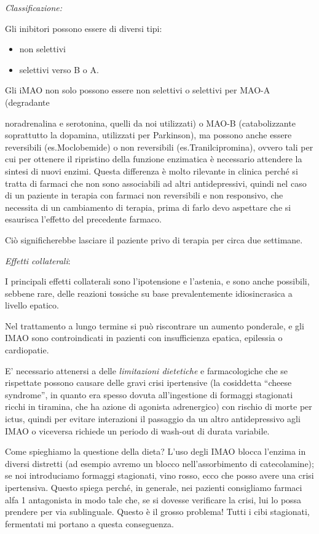 \begin{itemize}
\begin{itemize}
\emph{\emph{Classificazione:}}

Gli inibitori possono essere di diversi tipi:

\begin{itemize}
\item
  non selettivi
\item
  selettivi verso B o A.
\end{itemize}

Gli iMAO non solo possono essere non selettivi o selettivi per MAO-A
(degradante

noradrenalina e serotonina, quelli da noi utilizzati) o MAO-B
(catabolizzante soprattutto la dopamina, utilizzati per Parkinson), ma
possono anche essere reversibili (es.Moclobemide) o non reversibili
(es.Tranilcipromina), ovvero tali per cui per ottenere il ripristino
della funzione enzimatica è necessario attendere la sintesi di nuovi
enzimi. Questa differenza è molto rilevante in clinica perché si tratta
di farmaci che non sono associabili ad altri antidepressivi, quindi nel
caso di un paziente in terapia con farmaci non reversibili e non
responsivo, che necessita di un cambiamento di terapia, prima di farlo
devo aspettare che si esaurisca l'effetto del precedente farmaco.

Ciò significherebbe lasciare il paziente privo di terapia per circa due
settimane.

\emph{\emph{Effetti collaterali}}:

I principali effetti collaterali sono l'ipotensione e l'astenia, e sono
anche possibili, sebbene rare, delle reazioni tossiche su base
prevalentemente idiosincrasica a livello epatico.

Nel trattamento a lungo termine si può riscontrare un aumento ponderale,
e gli IMAO sono controindicati in pazienti con insufficienza epatica,
epilessia o cardiopatie.

E' necessario attenersi a delle \emph{limitazioni dietetiche} e
farmacologiche che se rispettate possono causare delle gravi crisi
ipertensive (la cosiddetta ``cheese syndrome'', in quanto era spesso
dovuta all'ingestione di formaggi stagionati ricchi in tiramina, che ha
azione di agonista adrenergico) con rischio di morte per ictus, quindi
per evitare interazioni il passaggio da un altro antidepressivo agli
IMAO o viceversa richiede un periodo di wash-out di durata variabile.

Come spieghiamo la questione della dieta? L'uso degli IMAO blocca
l'enzima in diversi distretti (ad esempio avremo un blocco
nell'assorbimento di catecolamine); se noi introduciamo formaggi
stagionati, vino rosso, ecco che posso avere una crisi ipertensiva.
Questo spiega perché, in generale, nei pazienti consigliamo farmaci alfa
1 antagonista in modo tale che, se si dovesse verificare la crisi, lui
lo possa prendere per via sublinguale. Questo è il grosso problema!
Tutti i cibi stagionati, fermentati mi portano a questa conseguenza.


\end{itemize}
\end{itemize}
